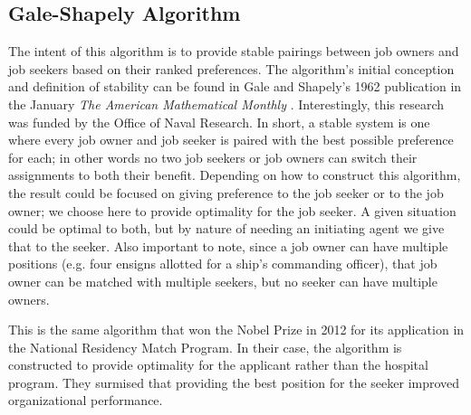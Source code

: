 \subsection{Gale-Shapely Algorithm}

The intent of this algorithm is to provide stable pairings between job owners and job seekers based on their ranked preferences. The algorithm's initial conception and definition of stability can be found in Gale and Shapely's 1962 publication in the January \textit{The American Mathematical Monthly} \cite{gale_shapely}. Interestingly, this research was funded by the Office of Naval Research. In short, a stable system is one where every job owner and job seeker is paired with the best possible preference for each; in other words no two job seekers or job owners can switch their assignments to both their benefit. Depending on how to construct this algorithm, the result could be focused on giving preference to the job seeker or to the job owner; we choose here to provide optimality for the job seeker. A given situation could be optimal to both, but by nature of needing an initiating agent we give that to the seeker. Also important to note, since a job owner can have multiple positions (e.g. four ensigns allotted for a ship's commanding officer), that job owner can be matched with multiple seekers, but no seeker can have multiple owners.

This is the same algorithm that won the Nobel Prize in 2012 for its application in the National Residency Match Program. In their case, the algorithm is constructed to provide optimality for the applicant rather than the hospital program. They surmised that providing the best position for the seeker improved organizational performance.

